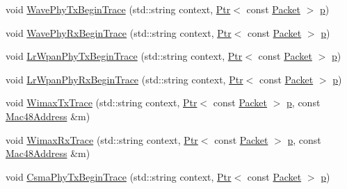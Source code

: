 \begin{DoxyCompactItemize}
\item 
void \hyperlink{classns3_1_1AnimationInterface_a55d12ba95e0e93941d5912a50ef5c1e4}{Wave\+Phy\+Tx\+Begin\+Trace} (std\+::string context, \hyperlink{classns3_1_1Ptr}{Ptr}$<$ const \hyperlink{classns3_1_1Packet}{Packet} $>$ \hyperlink{lte__link__budget__x2__handover__measures_8m_ac9de518908a968428863f829398a4e62}{p})
\item 
void \hyperlink{classns3_1_1AnimationInterface_af08889e9f06ddd922b5a179c374d0f21}{Wave\+Phy\+Rx\+Begin\+Trace} (std\+::string context, \hyperlink{classns3_1_1Ptr}{Ptr}$<$ const \hyperlink{classns3_1_1Packet}{Packet} $>$ \hyperlink{lte__link__budget__x2__handover__measures_8m_ac9de518908a968428863f829398a4e62}{p})
\item 
void \hyperlink{classns3_1_1AnimationInterface_a0e7f7deb7c291468723657f263317ee9}{Lr\+Wpan\+Phy\+Tx\+Begin\+Trace} (std\+::string context, \hyperlink{classns3_1_1Ptr}{Ptr}$<$ const \hyperlink{classns3_1_1Packet}{Packet} $>$ \hyperlink{lte__link__budget__x2__handover__measures_8m_ac9de518908a968428863f829398a4e62}{p})
\item 
void \hyperlink{classns3_1_1AnimationInterface_a1457c08242d10ec3506242cc9699c836}{Lr\+Wpan\+Phy\+Rx\+Begin\+Trace} (std\+::string context, \hyperlink{classns3_1_1Ptr}{Ptr}$<$ const \hyperlink{classns3_1_1Packet}{Packet} $>$ \hyperlink{lte__link__budget__x2__handover__measures_8m_ac9de518908a968428863f829398a4e62}{p})
\item 
void \hyperlink{classns3_1_1AnimationInterface_a11b4be6f8814a0bbeade46fb459c1cb9}{Wimax\+Tx\+Trace} (std\+::string context, \hyperlink{classns3_1_1Ptr}{Ptr}$<$ const \hyperlink{classns3_1_1Packet}{Packet} $>$ \hyperlink{lte__link__budget__x2__handover__measures_8m_ac9de518908a968428863f829398a4e62}{p}, const \hyperlink{classns3_1_1Mac48Address}{Mac48\+Address} \&m)
\item 
void \hyperlink{classns3_1_1AnimationInterface_aa8d5fb8e55267b669a99599e0a27afe9}{Wimax\+Rx\+Trace} (std\+::string context, \hyperlink{classns3_1_1Ptr}{Ptr}$<$ const \hyperlink{classns3_1_1Packet}{Packet} $>$ \hyperlink{lte__link__budget__x2__handover__measures_8m_ac9de518908a968428863f829398a4e62}{p}, const \hyperlink{classns3_1_1Mac48Address}{Mac48\+Address} \&m)
\item 
void \hyperlink{classns3_1_1AnimationInterface_a5a5e67141fc717272c0c44a5afbae89a}{Csma\+Phy\+Tx\+Begin\+Trace} (std\+::string context, \hyperlink{classns3_1_1Ptr}{Ptr}$<$ const \hyperlink{classns3_1_1Packet}{Packet} $>$ \hyperlink{lte__link__budget__x2__handover__measures_8m_ac9de518908a968428863f829398a4e62}{p})

\end{DoxyCompactItemize}
